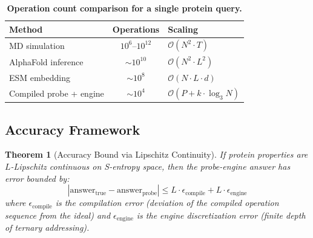 \documentclass[11pt,twocolumn,a4paper]{article}
\newtheorem{theorem}{Theorem}[section]
\theoremstyle{definition}
\theoremstyle{remark}
\begin{document}
\begin{table}[H]
\centering
\caption{\textbf{Operation count comparison for a single protein query.}}
\label{tab:operations}
\begin{tabular}{@{}lcl@{}}
\toprule
\textbf{Method} & \textbf{Operations} & \textbf{Scaling} \\
\midrule
MD simulation & $10^{6}$--$10^{12}$ & $\mathcal{O}(N^2 \cdot T)$ \\
AlphaFold inference & $\sim 10^{10}$ & $\mathcal{O}(N^2 \cdot L^2)$ \\
ESM embedding & $\sim 10^{8}$ & $\mathcal{O}(N \cdot L \cdot d)$ \\
Compiled probe + engine & $\sim 10^{4}$ & $\mathcal{O}(P + k \cdot \log_3 N)$ \\
\bottomrule
\end{tabular}
\end{table}

\subsection{Accuracy Framework}

\begin{theorem}[Accuracy Bound via Lipschitz Continuity]
\label{thm:accuracy_bound}
If protein properties are $L$-Lipschitz continuous on S-entropy space, then the probe-engine answer has error bounded by:
\begin{equation}
|\text{answer}_{\text{true}} - \text{answer}_{\text{probe}}| \leq L \cdot \epsilon_{\text{compile}} + L \cdot \epsilon_{\text{engine}}
\end{equation}
where $\epsilon_{\text{compile}}$ is the compilation error (deviation of the compiled operation sequence from the ideal) and $\epsilon_{\text{engine}}$ is the engine discretization error (finite depth of ternary addressing).
\end{theorem}
\end{document}
